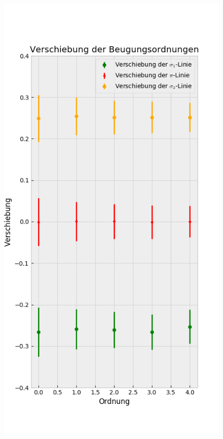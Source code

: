 \begin{myframe}{}
\begin{figure}
              \includegraphics[height=.85\paperheight]{img/diff_sco12A}

\end{figure}
\end{myframe}
